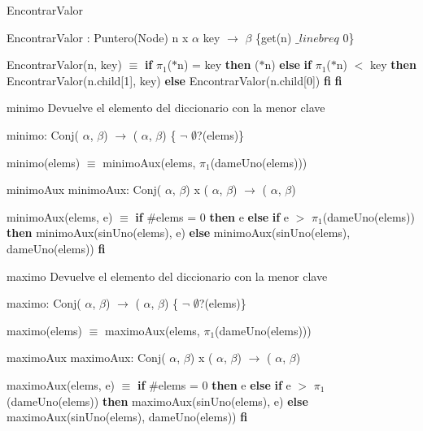 \begin{DoxyParagraph}{\-Encontrar\-Valor}

\end{DoxyParagraph}
\-Encontrar\-Valor \-: \-Puntero(\-Node) n x $\alpha$ key $\to$ $\beta$ \{get(n) $\_linebr eq$ 0\}\par
 \-Encontrar\-Valor(n, key) $\equiv$ {\bfseries if} $\pi_1$($\ast$n) = key {\bfseries then} ($\ast$n) {\bfseries else} {\bfseries if} $\pi_1$($\ast$n) $<$ key {\bfseries then} \-Encontrar\-Valor(n.\-child\mbox{[}1\mbox{]}, key) {\bfseries else} \-Encontrar\-Valor(n.\-child\mbox{[}0\mbox{]}) {\bfseries fi} {\bfseries fi} 

\begin{DoxyParagraph}{minimo}
\-Devuelve el elemento del diccionario con la menor clave \par
 minimo\-: \-Conj( $\alpha$, $\beta$) $\to$ ( $\alpha$, $\beta$) \{ $\lnot$ $\emptyset$?(elems)\}\par
 minimo(elems) $\equiv$ minimo\-Aux(elems, $\pi_1$(dame\-Uno(elems))) 
\end{DoxyParagraph}
\begin{DoxyParagraph}{minimo\-Aux}
minimo\-Aux\-: \-Conj( $\alpha$, $\beta$) x ( $\alpha$, $\beta$) $\to$ ( $\alpha$, $\beta$)\par
 minimo\-Aux(elems, e) $\equiv$ {\bfseries if} \#elems = 0 {\bfseries then} e {\bfseries else} {\bfseries if} e $>$ $\pi_1$(dame\-Uno(elems)) {\bfseries then} minimo\-Aux(sin\-Uno(elems), e) {\bfseries else} minimo\-Aux(sin\-Uno(elems), dame\-Uno(elems)) {\bfseries fi} 
\end{DoxyParagraph}
\begin{DoxyParagraph}{maximo}
\-Devuelve el elemento del diccionario con la menor clave\par
 maximo\-: \-Conj( $\alpha$, $\beta$) $\to$ ( $\alpha$, $\beta$) \{ $\lnot$ $\emptyset$?(elems)\}\par
 maximo(elems) $\equiv$ maximo\-Aux(elems, $\pi_1$(dame\-Uno(elems))) 
\end{DoxyParagraph}
\begin{DoxyParagraph}{maximo\-Aux}
maximo\-Aux\-: \-Conj( $\alpha$, $\beta$) x ( $\alpha$, $\beta$) $\to$ ( $\alpha$, $\beta$)\par
 maximo\-Aux(elems, e) $\equiv$ {\bfseries if} \#elems = 0 {\bfseries then} e {\bfseries else} {\bfseries if} e $>$ $\pi_1$(dame\-Uno(elems)) {\bfseries then} maximo\-Aux(sin\-Uno(elems), e) {\bfseries else} maximo\-Aux(sin\-Uno(elems), dame\-Uno(elems)) {\bfseries fi}  
\end{DoxyParagraph}
